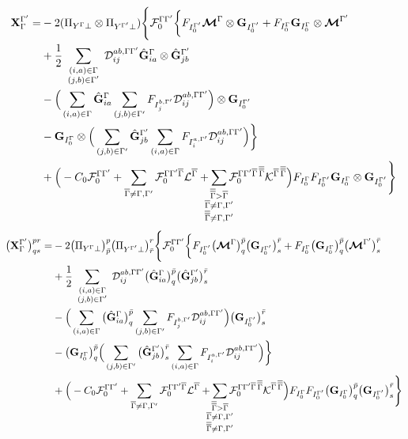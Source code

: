 \begin{equation}
  \begin{split}
    \mathbf{X}_\irp^\irpP = &
    -2 (\Pi_{Y^\irp \perp} \otimes \Pi_{Y^\irpP \perp})
    \Bigg\{ \mathcal{F}_0^{\irp\irpP}
    \bigg\{
    F_{I_0^\irpP} \matM^\irp \otimes \matG_{I_0^\irpP}
    + F_{I_0^\irp} \matG_{I_0^\irp} \otimes \matM^\irpP\\
    & + \frac{1}{2} \sumijabmix \Dmix_{ij}^{ab, \irp\irpP}
      \hat{\matG}_{ia}^\irp \otimes \hat{\matG}_{jb}^\irpP\\
    & - \Big(
        \sum_{(i,a)\in\irp} \hat{\matG}_{ia}^\irp
        \sum_{(j,b)\in\irpP} F_{I_j^{b,\irpP}} \Dmix_{ij}^{ab, \irp\irpP}
    \Big) \otimes \matG_{I_0^\irpP}\\
    & - \matG_{I_0^\irp} \otimes \Big(
        \sum_{(j,b)\in\irpP} \hat{\matG}_{jb}^\irpP
        \sum_{(i,a)\in\irp} F_{I_i^{a,\irpP}} \Dmix_{ij}^{ab, \irp\irpP}
    \Big)
    \bigg\}\\
    & + 
    \Big(
        -C_0 \mathcal{F}_0^{\irp\irpP}
        + \sumBp \mathcal{F}_0^{\irp\irpP\irpB} \mathcal{L}^\irpB
        + \sumBBp \mathcal{F}_0^{\irp\irpP\irpB\,\irpBB} \mathcal{K}^{\irpB\,\irpBB}
    \Big)
    F_{I_0^\irp} F_{I_0^\irpP} \matG_{I_0^\irp} \otimes \matG_{I_0^\irpP}
    \Bigg\}
  \end{split}
\end{equation}
\begin{equation}
  \begin{split}
    \big( \mathbf{X}_\irp^\irpP \big)^{pr}_{qs} = &
    -2 \big( \Pi_{Y^\irp \perp} \big)^p_{\bar{p}} \big( \Pi_{Y^\irpP \perp} \big)^r_{\bar{r}}
    \Bigg\{ \mathcal{F}_0^{\irp\irpP}
    \bigg\{
    F_{I_0^\irpP} \big( \matM^\irp \big)^{\bar{p}}_q \big( \matG_{I_0^\irpP} \big)^{\bar{r}}_s
    + F_{I_0^\irp} \big( \matG_{I_0^\irp} \big)^{\bar{p}}_q \big( \matM^\irpP \big)^{\bar{r}}_s\\
    & + \frac{1}{2} \sumijabmix \Dmix_{ij}^{ab, \irp\irpP}
      \big( \hat{\matG}_{ia}^\irp \big)^{\bar{p}}_q \big( \hat{\matG}_{jb}^\irpP \big)^{\bar{r}}_s\\
    & - \Big(
        \sum_{(i,a)\in\irp} \big( \hat{\matG}_{ia}^\irp \big)^{\bar{p}}_q
        \sum_{(j,b)\in\irpP} F_{I_j^{b,\irpP}} \Dmix_{ij}^{ab, \irp\irpP}
    \Big) \big( \matG_{I_0^\irpP} \big)^{\bar{r}}_s\\
    & - \big( \matG_{I_0^\irp} \big)^{\bar{p}}_q \Big(
        \sum_{(j,b)\in\irpP} \big( \hat{\matG}_{jb}^\irpP \big)^{\bar{r}}_s
        \sum_{(i,a)\in\irp} F_{I_i^{a,\irpP}} \Dmix_{ij}^{ab, \irp\irpP}
    \Big)
    \bigg\}\\
    & + 
    \Big(
        -C_0 \mathcal{F}_0^{\irp\irpP}
        + \sumBp \mathcal{F}_0^{\irp\irpP\irpB} \mathcal{L}^\irpB
        + \sumBBp \mathcal{F}_0^{\irp\irpP\irpB\,\irpBB} \mathcal{K}^{\irpB\,\irpBB}
    \Big)
    F_{I_0^\irp} F_{I_0^\irpP}
    \big( \matG_{I_0^\irp} \big)^{\bar{p}}_{q} \big( \matG_{I_0^\irpP} \big)^{\bar{r}}_s
    \Bigg\}
  \end{split}
\end{equation}

